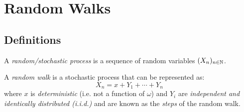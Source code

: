 \documentclass[../main.tex]{subfiles}
\begin{document}
\section{Random Walks}
\subsection{Definitions}
\begin{definition}
  A \textit{random/stochastic process} is a sequence of random variables $(X_n)_{n \in \mathbb{N}}$.
\end{definition}
\begin{definition}
  A \textit{random walk} is a stochastic process that can be represented as:
  \[
    X_n = x + Y_1 + \cdots + Y_n
  \]
  where $x$ is \textit{deterministic} (i.e. not a function of $\omega$) and $Y_i$ are \textit{independent and identically distributed (i.i.d.)} and are known as the \textit{steps} of the random walk.
\end{definition}
\end{document}
